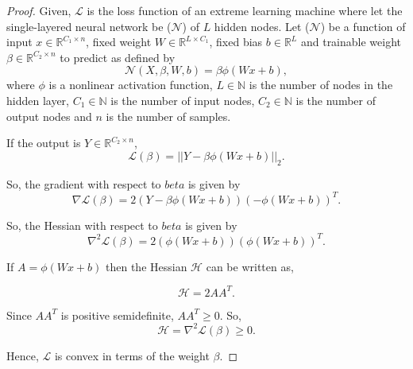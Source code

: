 \documentclass{article}
\begin{document}
\begin{proof}
\label{pf: elmconvexity}
Given, \(\mathcal{L}\) is the loss function of an extreme learning machine where let the single-layered neural network be (\(\mathcal{N}\)) of \(L\) hidden nodes. Let (\(\mathcal{N}\)) be a function of input \(x \in \mathbb{R}^{C_1 \times n}\), fixed weight \(W \in \mathbb{R}^{L \times C_1}\), fixed bias \(b \in \mathbb{R}^L\) and trainable weight \(\beta \in \mathbb{R}^{C_2 \times n}\)  to predict as defined by
\begin{equation}
\mathcal{N}(X, \beta, W, b) = \beta\phi(Wx + b),
\end{equation}
where \(\phi\) is a nonlinear activation function, \(L \in \mathbb{N}\) is the number of nodes in the hidden layer, \(C_1 \in \mathbb{N}\) is the number of input nodes, \(C_2 \in \mathbb{N}\) is the number of output nodes and \(n\) is the number of samples.

If the output is \(Y \in \mathbb{R}^{C_2 \times n}\), 
\begin{equation}
\mathcal{L}(\beta) = ||Y - \beta\phi(Wx + b)||_2.
\end{equation}

So, the gradient with respect to \(beta\) is given by
\begin{equation}
\nabla\mathcal{L}(\beta) = 2(Y - \beta\phi(Wx + b))(-\phi(Wx + b))^T.
\end{equation}

So, the Hessian with respect to \(beta\) is given by
\begin{equation}
\nabla^2\mathcal{L}(\beta) = 2(\phi(Wx + b))(\phi(Wx + b))^T.
\end{equation}

If \(A = \phi(Wx + b)\) then the Hessian \(\mathcal{H}\) can be written as,

\begin{equation}
\mathcal{H} = 2 AA^T.
\end{equation}

Since \(AA^T\) is positive semidefinite, \(AA^T \geq 0\).
So,
\begin{equation}
    \mathcal{H} = \nabla^2\mathcal{L}(\beta) \geq 0.
\end{equation}

Hence, \(\mathcal{L}\) is convex in terms of the weight \(\beta\).

\end{proof}
\end{document}
